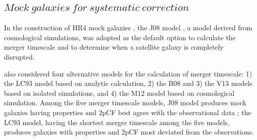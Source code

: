 \documentclass[iop]{emulateapj}
\begin{document}


\subsection{$Mock\ galaxies\ for\ systematic\ correction$}

In the construction of HR4 mock galaxies \citep{hong2016}, 
the J08 model \citep{jiang2008}, a model derived from cosmological simulations, 
was adopted as the default option to calculate the merger timescale and to determine when a satellite galaxy is completely disrupted.

\cite{hong2016} also considered four alternative models for the calculation of merger timescale:
1) the LC93 model \citep{LC93} based on analytic calculation, 
2) the B08 \citep{B08} and 3) the V13 \citep{V13} models based on isolated simulations,
and 4) the M12 model \citep{M12} based on cosmological simulation.
Among the five merger timescale models, 
J08 model produces mock galaxies having properties and 2pCF best agree with the observational data \citep{hong2016};
the LC93 model, having the shortest merger timescale among the five models,
produces galaxies with properties and 2pCF most deviated from the observations.
\end{document}
